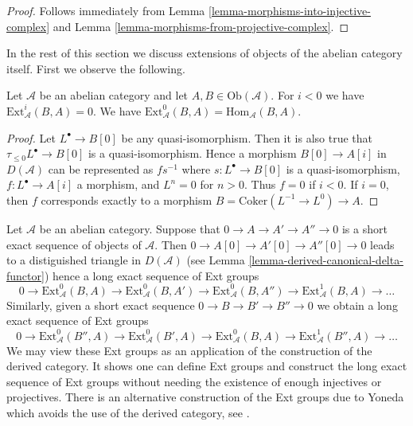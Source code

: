 \begin{proof}
Follows immediately from
Lemma \ref{lemma-morphisms-into-injective-complex}
and
Lemma \ref{lemma-morphisms-from-projective-complex}.
\end{proof}

\noindent
In the rest of this section we discuss extensions of objects of the
abelian category itself. First we observe the following.

\begin{lemma}
\label{lemma-negative-exts}
Let $\mathcal{A}$ be an abelian category and let
$A, B \in \text{Ob}(\mathcal{A})$.
For $i < 0$ we have $\text{Ext}^i_\mathcal{A}(B, A) = 0$.
We have $\text{Ext}^0_\mathcal{A}(B, A) = \text{Hom}_\mathcal{A}(B, A)$.
\end{lemma}

\begin{proof}
Let $L^\bullet \to B[0]$ be any quasi-isomorphism.
Then it is also true that $\tau_{\leq 0}L^\bullet \to B[0]$
is a quasi-isomorphism. Hence a morphism $B[0] \to A[i]$
in $D(\mathcal{A})$ can be represented as $fs^{-1}$ where
$s : L^\bullet \to B[0]$ is a quasi-isomorphism, $f : L^\bullet \to A[i]$
a morphism, and $L^n = 0$ for $n > 0$. Thus $f = 0$ if $i < 0$.
If $i = 0$, then $f$ corresponds exactly to a morphism
$B = \text{Coker}(L^{-1} \to L^0) \to A$.
\end{proof}

\noindent
Let $\mathcal{A}$ be an abelian category.
Suppose that $0 \to A \to A' \to A'' \to 0$ is a short exact
sequence of objects of $\mathcal{A}$. Then
$0 \to A[0] \to A'[0] \to A''[0] \to 0$ leads to a distiguished
triangle in $D(\mathcal{A})$ (see
Lemma \ref{lemma-derived-canonical-delta-functor})
hence a long exact sequence of Ext groups
$$
0 \to \text{Ext}^0_\mathcal{A}(B, A) \to
\text{Ext}^0_\mathcal{A}(B, A') \to
\text{Ext}^0_\mathcal{A}(B, A'') \to
\text{Ext}^1_\mathcal{A}(B, A) \to \ldots
$$
Similarly, given a short exact sequence $0 \to B \to B' \to B'' \to 0$
we obtain a long exact sequence of Ext groups
$$
0 \to \text{Ext}^0_\mathcal{A}(B'', A) \to
\text{Ext}^0_\mathcal{A}(B', A) \to
\text{Ext}^0_\mathcal{A}(B, A) \to
\text{Ext}^1_\mathcal{A}(B'', A) \to \ldots
$$
We may view these Ext groups as an application of the construction of the
derived category. It shows one can define Ext groups and construct
the long exact sequence of Ext groups without needing the existence of enough
injectives or projectives. There is an alternative construction of the Ext
groups due to Yoneda which avoids the use of the derived category, see
\cite{Yoneda}.

